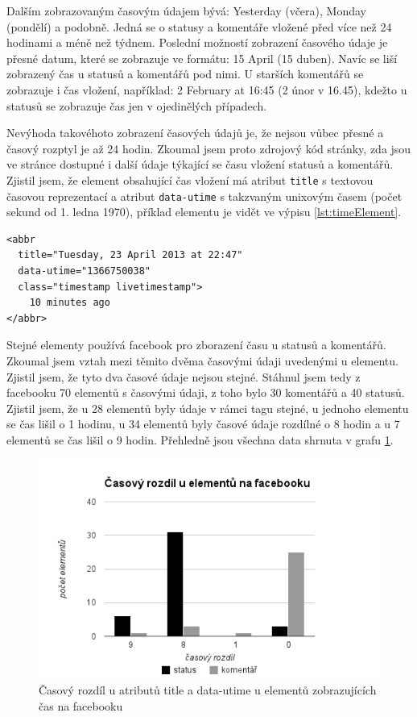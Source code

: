 \documentclass[thesis=M,czech]{FITthesis}[2013/05/10]
\begin{document}
Dalším zobrazovaným časovým údajem bývá: Yesterday (včera), Monday (pondělí) a podobně. Jedná se o statusy a komentáře vložené před více než 24 hodinami a méně než týdnem. Poslední možností zobrazení časového údaje je přesné datum, které se zobrazuje ve formátu: 15 April (15 duben). Navíc se liší zobrazený čas u statusů a komentářů pod nimi. U starších komentářů se zobrazuje i čas vložení, například: 2 February at 16:45 (2 únor v 16.45), kdežto u statusů se zobrazuje čas jen v ojedinělých případech.

Nevýhoda takovéhoto zobrazení časových údajů je, že nejsou vůbec přesné a časový rozptyl je až 24 hodin. Zkoumal jsem proto zdrojový kód stránky, zda jsou ve stránce dostupné i další údaje týkající se času vložení statusů a komentářů. Zjistil jsem, že element obsahující čas vložení má atribut \verb|title| s textovou časovou reprezentací a atribut \verb|data-utime| s takzvaným unixovým časem (počet sekund od 1. ledna 1970), příklad elementu je vidět ve výpisu \ref{lst:timeElement}. 

\begin{lstlisting}[caption={Příklad elementu obsahující čas},label=lst:timeElement,belowcaptionskip=0.4cm]
<abbr 
  title="Tuesday, 23 April 2013 at 22:47"
  data-utime="1366750038" 
  class="timestamp livetimestamp">
    10 minutes ago
</abbr>
\end{lstlisting}

Stejné elementy používá facebook pro zborazení času u statusů a komentářů. Zkoumal jsem vztah mezi těmito dvěma časovými údaji uvedenými u elementu. Zjistil jsem, že tyto dva časové údaje nejsou stejné. Stáhnul jsem tedy z facebooku 70 elementů s časovými údaji, z toho bylo 30 komentářů a 40 statusů. Zjistil jsem, že u 28 elementů byly údaje v rámci tagu stejné, u jednoho elementu se čas lišil o 1 hodinu, u 34 elementů byly časové údaje rozdílné o 8 hodin a u 7 elementů se čas lišil o 9 hodin. Přehledně jsou všechna data shrnuta v grafu \ref{fig:timeDifference}.

\begin{figure}[h]
\begin{center}
\includegraphics[width=5in]{figures/time-difference.png}
\caption{Časový rozdíl u atributů title a data-utime u elementů zobrazujících čas na facebooku}
\label{fig:timeDifference}
\end{center}
\end{figure}
\end{document}
